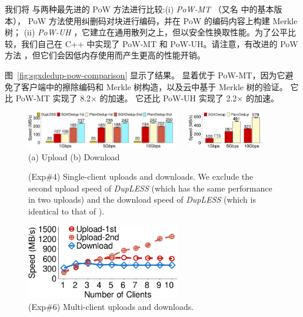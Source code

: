 我们将 \sysnameS 与两种最先进的 PoW 方法进行比较:(i) \textit{ PoW-MT} \cite{halevi11}（又名 \cite{halevi11} 中的基本版本）， PoW 方法使用纠删码对块进行编码，并在 PoW 的编码内容上构建 Merkle 树； (ii) \textit{ PoW-UH} \cite{xu13}，它建立在通用散列之上，但以安全性换取性能。为了公平比较，我们自己在 C++ 中实现了 PoW-MT 和 PoW-UH。请注意，有改进的 PoW 方法 \cite{halevi11}，但它们会因低内存使用而产生更高的性能开销。


图~\ref{fig:sgxdedup-pow-comparison} 显示了结果。 \sysnameS 显着优于 PoW-MT，因为它避免了客户端中的擦除编码和 Merkle 树构造，以及云中基于 Merkle 树的验证。 它比 PoW-MT 实现了 8.2$\times$ 的加速。 它还比 PoW-UH 实现了 2.2$\times$ 的加速。


\begin{figure}[t]
  \centering
  \includegraphics[width=0.6\textwidth]{pic/sgxdedup/upload_network_speed_bar.pdf} \ \ 
  \includegraphics[width=0.3\textwidth]{pic/sgxdedup/download_network_speed_bar.pdf}
  \vspace{-3pt}\\
    \hspace{1.1in} {\small (a) Upload} \hspace{1.9in}
  {\small (b) Download}
  \vspace{-6pt}\\
  \caption{(Exp\#4) Single-client uploads and downloads. We exclude the second upload speed of {\em DupLESS} (which has the same performance in two uploads) and the download speed of {\em DupLESS} (which is identical to that of  \sysnameS).}
  \label{fig:sgxdedup-singleClientThroughput}
\end{figure}

\begin{figure}[t]
  \centering
  \includegraphics[width=0.6\textwidth]{pic/sgxdedup/expb1_multiple_client.pdf}  
  \caption{(Exp\#6) Multi-client uploads and downloads.}
  \label{fig:sgxdedup-multiClientThroughput}
\end{figure}

